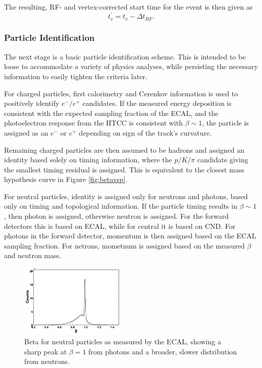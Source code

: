 The resulting, RF- and vertex-corrected start time for the event is then given as
\begin{equation}\label{eq:starttime}
t^{\prime}_v = t_v - \Delta t_{RF}.
\end{equation}

\subsubsection{Particle Identification}
The next stage is a basic particle identification scheme.  This is intended to be loose to accommodate a variety of physics analyses, while persisting the necessary information to easily tighten the criteria later.

For charged particles, first calorimetry and Cerenkov information is used to positively identify $e^-/e^+$ candidates.  If the measured energy deposition is consistent with the expected sampling fraction of the ECAL, and the photoelectron response from the HTCC is consistent with $\beta\sim1$, the particle is assigned as an $e^-$ or $e^+$ depending on sign of the track's curvature.

Remaining charged particles are then assumed to be hadrons and assigned an identity based solely on timing information, where the $p/K/\pi$ candidate giving the smallest timing residual is assigned.  This is equivalent to the closest mass hypothesis curve in Figure \ref{fig:betavsp}.

For neutral particles, identity is assigned only for neutrons and photons, based only on timing and topological information.  If the particle timing results in $\beta\sim1$, then photon is assigned, otherwise neutron is assigned.  For the forward detectors this is based on ECAL, while for central it is based on CND.  For photons in the forward detector, momentum is then assigned based on the ECAL sampling fraction.  For netrons, mometnum is assigned based on the measured $\beta$ and neutron mass.

\begin{figure}
\centering
\includegraphics[width=0.45\textwidth]{pics/neutral_beta.png}
\caption{Beta for neutral particles as measured by the ECAL, showing a sharp peak at $\beta=1$ from photons and a broader, slower distribution from neutrons. }
\label{fig:neutbeta}
\end{figure}

